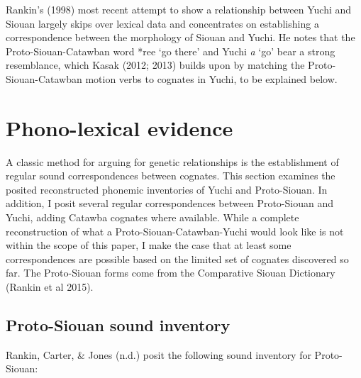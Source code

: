 \documentclass[output=paper]{LSP/langsci}
\begin{document}
{Rankin's (1998) most recent attempt to show a relationship between Yuchi and Siouan largely skips over lexical data and concentrates on establishing a correspondence between the morphology of Siouan and Yuchi. He notes that the Proto-Siouan-Catawban word *ree `go there' and Yuchi \emph{\textbeltl a} `go' bear a strong resemblance, which Kasak (2012; 2013) builds upon by matching the Proto-Siouan-Catawban motion verbs to cognates in Yuchi, to be explained below.

\section{Phono-lexical evidence}

A classic method for arguing for genetic relationships is the establishment of regular sound correspondences between cognates. This section examines the posited reconstructed phonemic inventories of Yuchi and Proto-Siouan. In addition, I posit several regular correspondences between Proto-Siouan and Yuchi, adding Catawba cognates where available. While a complete reconstruction of what a Proto-Siouan-Catawban-Yuchi would look like is not within the scope of this paper, I make the case that at least some correspondences are possible based on the limited set of cognates discovered so far. The Proto-Siouan forms come from the Comparative Siouan Dictionary (Rankin et al 2015).

\subsection{Proto-Siouan sound inventory}

Rankin, Carter, \& Jones (n.d.) posit the following sound inventory for Proto-Siouan:

}
\end{document}
